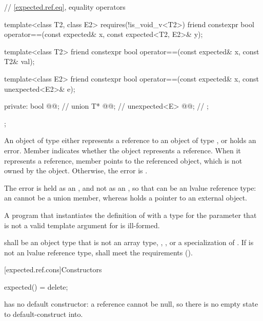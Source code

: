\begin{codeblock}
{{    // \ref{expected.ref.eq}, equality operators

    template<class T2, class E2>
      requires(!is_void_v<T2>)
    friend constexpr bool operator==(const expected& x, const expected<T2, E2>& y);

    template<class T2>
    friend constexpr bool operator==(const expected& x, const T2& val);

    template<class E2>
    friend constexpr bool operator==(const expected& x, const unexpected<E2>& e);

  private:
    bool @@; // \expos
    union {
      T* @@;             // \expos
      unexpected<E> @@; // \expos
    };
  };
}
\end{codeblock}

\pnum
An object of type  either represents a reference to an object of type , or holds an error. Member  indicates whether the object represents a reference. When it represents a reference, member  points to the referenced object, which is not owned by the  object. Otherwise, the error is .

\pnum
The error is held as an , and not as an , so that  can be an lvalue reference type: an  cannot be a union member, whereas  holds a pointer to an external object.

\pnum
A program that instantiates the definition of  with a type for the  parameter that is not a valid template argument for  is ill-formed.

\pnum
{} shall be an object type that is not an array type, , , or a specialization of . If  is not an lvalue reference type,  shall meet the  requirements ().


[expected.ref.cons]{Constructors}

%
\begin{itemdecl}
expected() = delete;
\end{itemdecl}

\begin{itemdescr}
\pnum
\remarks
{} has no default constructor: a reference cannot be null, so there is no empty state to default-construct into.
\end{itemdescr}

